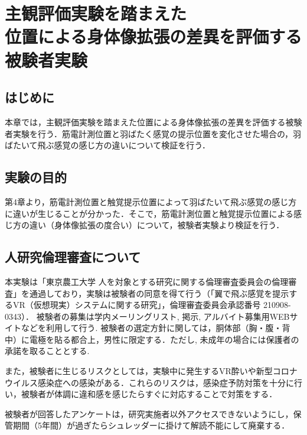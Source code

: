 \chapter[主観評価実験を踏まえた位置による身体像拡張の差異を評価する被験者実験]%
        {主観評価実験を踏まえた\\位置による身体像拡張の差異を評価する\\被験者実験}

\section{はじめに}
        本章では，主観評価実験を踏まえた位置による身体像拡張の差異を評価する被験者実験を行う．筋電計測位置と羽ばたく感覚の提示位置を変化させた場合の，羽ばたいて飛ぶ感覚の感じ方の違いについて検証を行う．

\section{実験の目的}
        第4章より，筋電計測位置と触覚提示位置によって羽ばたいて飛ぶ感覚の感じ方に違いが生じることが分かった．そこで，筋電計測位置と触覚提示位置による感じ方の違い（身体像拡張の度合い）について，被験者実験より検証を行う．
        
\section{人研究倫理審査について}
        本実験は「東京農工大学 人を対象とする研究に関する倫理審査委員会の倫理審査」を通過しており，実験は被験者の同意を得て行う（「翼で飛ぶ感覚を提示するVR（仮想現実）システムに関する研究」，倫理審査委員会承認番号 210908-0343）．
        被験者の募集は学内メーリングリスト, 掲示, アルバイト募集用WEBサイトなどを利用して行う. 被験者の選定方針に関しては，胴体部（胸・腹・背中）に電極を貼る都合上，男性に限定する．ただし, 未成年の場合には保護者の承諾を取ることとする. 

        また，被験者に生じるリスクとしては，実験中に発生するVR酔いや新型コロナウイルス感染症への感染がある．これらのリスクは，感染症予防対策を十分に行い，被験者が体調に違和感を感じたらすぐに対応することで対策をする．

        被験者が回答したアンケートは，研究実施者以外アクセスできないようにし，保管期間（5年間）が過ぎたらシュレッダーに掛けて解読不能にして廃棄する．
        

